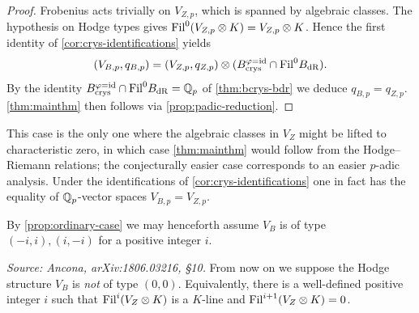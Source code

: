\begin{proof}
  Frobenius acts trivially on \(V_{Z,p}\), which is spanned by algebraic
  classes. The hypothesis on Hodge types gives \(\mathrm{Fil}^0(V_{Z,p} \otimes K) =
  V_{Z,p} \otimes K\). Hence the first identity of \cref{cor:crys-identifications}
  yields
  \[(V_{B,p}, q_{B,p}) = (V_{Z,p}, q_{Z,p}) \otimes (B_{\mathrm{crys}}^{\varphi=\mathrm{id}} \cap
    \mathrm{Fil}^0 B_{\mathrm{dR}}).\]
  By the identity \(B_{\mathrm{crys}}^{\varphi=\mathrm{id}} \cap \mathrm{Fil}^0 B_{\mathrm{dR}} = \mathbb{Q}_p\) of
  \cref{thm:bcrys-bdr} we deduce \(q_{B,p} = q_{Z,p}\). \cref{thm:mainthm} then
  follows via \cref{prop:padic-reduction}.
\end{proof}

\begin{remark}
  This case is the only one where the algebraic classes in \(V_Z\) might be
  lifted to characteristic zero, in which case \cref{thm:mainthm} would follow
  from the Hodge--Riemann relations; the conjecturally easier case corresponds
  to an easier \(p\)-adic analysis. Under the identifications of
  \cref{cor:crys-identifications} one in fact has the equality of
  \(\mathbb{Q}_p\)-vector spaces \(V_{B,p} = V_{Z,p}\).
\end{remark}

By \cref{prop:ordinary-case} we may henceforth assume \(V_B\) is of type
\((-i,i),(i,-i)\) for a positive integer \(i\).

\begin{definition}
  \label{ass:i-positive}
  \textit{Source: Ancona, arXiv:1806.03216, \S10.}
  From now on we suppose the Hodge structure \(V_B\) is \emph{not} of type
  \((0,0)\). Equivalently, there is a well-defined positive integer \(i\) such
  that \(\mathrm{Fil}^i(V_Z \otimes K)\) is a \(K\)-line and
  \(\mathrm{Fil}^{i+1}(V_Z \otimes K) = 0\).
\end{definition}

